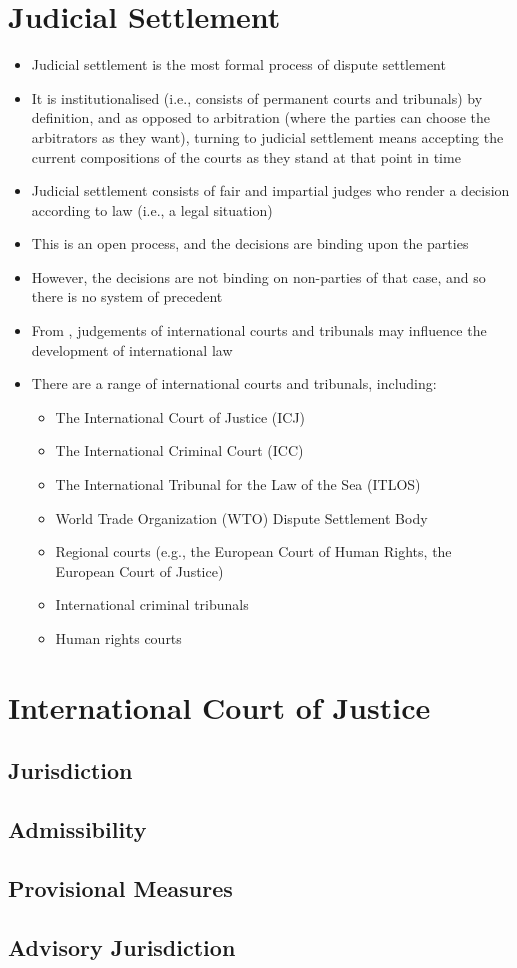 \section{Judicial Settlement}
\begin{itemize}
    \item Judicial settlement is the most formal process of dispute settlement
    \item It is institutionalised (i.e., consists of permanent courts and tribunals) by definition, and as opposed to arbitration (where the parties can choose the arbitrators as they want), turning to judicial settlement means accepting the current compositions of the courts as they stand at that point in time
    \item Judicial settlement consists of fair and impartial judges who render a decision according to law (i.e., a legal situation)
    \item This is an open process, and the decisions are binding upon the parties
    \item However, the decisions are not binding on non-parties of that case, and so there is no system of precedent
    \item From , judgements of international courts and tribunals may influence the development of international law
    \item There are a range of international courts and tribunals, including:
    \begin{itemize}
        \item The International Court of Justice (ICJ)
        \item The International Criminal Court (ICC)
        \item The International Tribunal for the Law of the Sea (ITLOS)
        \item World Trade Organization (WTO) Dispute Settlement Body
        \item Regional courts (e.g., the European Court of Human Rights, the European Court of Justice)
        \item International criminal tribunals
        \item Human rights courts
    \end{itemize}
\end{itemize}

\section{International Court of Justice}

\subsection{Jurisdiction}

\subsection{Admissibility}

\subsection{Provisional Measures}

\subsection{Advisory Jurisdiction}